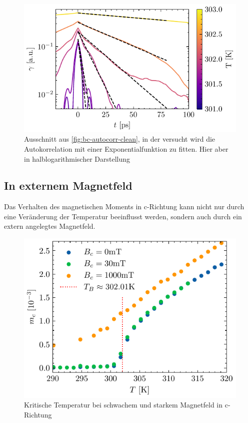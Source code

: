 \documentclass[main.tex]{subfiles}
\begin{document}

\begin{figure}[H]
    \centering
    \includegraphics{bilder/plots/temp_comparison/autocorrelation_cleaned_log.pdf}
    \caption{Ausschnitt aus \cref{fig:bc-autocorr-clean}, in der versucht wird die Autokorrelation mit einer Exponentialfunktion zu fitten. Hier aber in halblogarithmischer Darstellung}\label{fig:temp-autocorr-fit}
\end{figure}

\subsection{In externem Magnetfeld}

Das Verhalten des magnetischen Moments in c-Richtung kann nicht nur durch eine Veränderung der Temperatur beeinflusst werden, sondern auch durch ein extern angelegtes Magnetfeld.

\begin{figure}[H]
    \centering
    \includegraphics{bilder/plots/Bz_comparison/critical_temperature.pdf}
    \caption{Kritische Temperatur bei schwachem und starkem Magnetfeld in c-Richtung }\label{fig:bc-crit-temp}
\end{figure}
\end{document}
